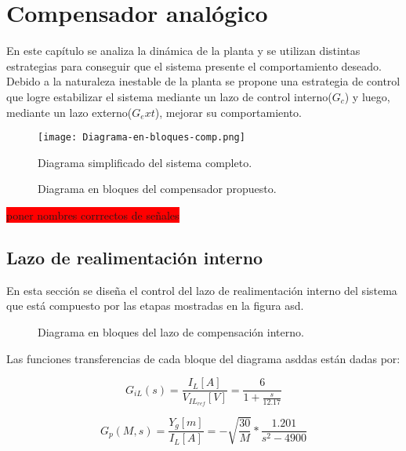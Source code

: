 \chapter{Compensador analógico}  \label{cap:Compensador Analogico}

En este capítulo se analiza la dinámica de la planta y se utilizan distintas estrategias para conseguir que el sistema presente el comportamiento deseado. Debido a la naturaleza inestable de la planta se propone una estrategia de control que logre estabilizar el sistema mediante un lazo de control interno($G_c$) y luego, mediante un lazo externo($G_ext$), mejorar su comportamiento. 


\begin{figure}[H]
	\centering
	\texttt{[image: Diagrama-en-bloques-comp.png]}
	\caption{Diagrama simplificado del sistema completo.}
	\label{fig:diag-en-bloques-comp_viejo}
\end{figure}

\begin{figure}[H]
	\centering
	\scalebox{0.8}{}
	\caption{Diagrama en bloques del compensador propuesto.}	\label{fig:diag-en-bloques-comp}
\end{figure}

\colorbox{red}{poner nombres corrrectos de señales}

\section{Lazo de realimentación interno}

En esta sección se diseña el control del lazo de realimentación interno del sistema que está compuesto por las etapas mostradas en la figura asd. 


\begin{figure}[H]
	\centering
	
	\caption{Diagrama en bloques del lazo de compensación interno.}	\label{fig:diag-interno}
\end{figure}

Las funciones transferencias de cada bloque del diagrama asddas están dadas por:

\begin{equation*}
	G_{iL}(s) =\frac{I_L[A]}{V_{IL_{ref}}[V]}=\frac{6}{1+\frac{s}{12.17}}
\end{equation*}

\begin{equation*} 
	G_{p}(M,s)=\frac{Y_g[m]}{I_L[A]}=-\sqrt{\frac{30}{M}}*\frac{1.201}{s^{2}-4900}
\end{equation*}

